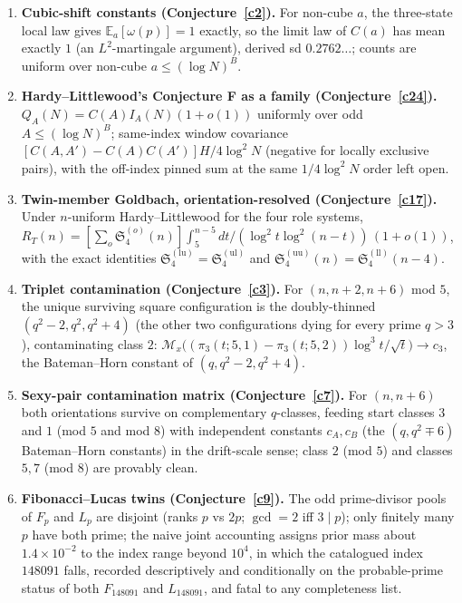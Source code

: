 \documentclass[11pt]{article}
\theoremstyle{definition}
\newcommand{\SG}{\mathfrak S}
\newcommand{\M}{\mathcal M}
\begin{document}
\begin{enumerate}
\item \textbf{Cubic-shift constants (Conjecture~\ref{c2}).}  For
non-cube $a$, the three-state local law gives
$\mathbb E_a[\omega(p)]=1$ exactly, so the limit law of $C(a)$ has
mean exactly $1$ (an $L^2$-martingale argument), derived sd
$0.2762\ldots$; counts are uniform over non-cube
$a\le(\log N)^B$.

\item \textbf{Hardy--Littlewood's Conjecture F as a family (Conjecture~\ref{c24}).}
$Q_A(N)=C(A)I_A(N)(1+o(1))$ uniformly over odd $A\le(\log N)^B$;
same-index window covariance
$[C(A,A')-C(A)C(A')]H/4\log^2N$ (negative for locally exclusive
pairs), with the off-index pinned sum at the same $1/4\log^2N$
order left open.

\item \textbf{Twin-member Goldbach, orientation-resolved
(Conjecture~\ref{c17}).}  Under $n$-uniform Hardy--Littlewood for
the four role systems,
$R_T(n)=[\sum_o\SG_4^{(o)}(n)]\int_5^{n-5}dt/(\log^2t\log^2(n-t))
\,(1+o(1))$, with the exact identities
$\SG_4^{(\mathrm{lu})}=\SG_4^{(\mathrm{ul})}$ and
$\SG_4^{(\mathrm{uu})}(n)=\SG_4^{(\mathrm{ll})}(n-4)$.

\item \textbf{Triplet contamination (Conjecture~\ref{c3}).}  For
$(n,n+2,n+6)$ mod $5$, the unique surviving square configuration is
the doubly-thinned $(q^2-2,q^2,q^2+4)$ (the other two configurations dying for every prime $q>3$), contaminating class
$2$: $\M_x\bigl((\pi_3(t;5,1)-\pi_3(t;5,2))\log^3t/\sqrt
t\bigr)\to c_3$, the Bateman--Horn constant of
$(q,q^2-2,q^2+4)$.

\item \textbf{Sexy-pair contamination matrix
(Conjecture~\ref{c7}).}  For $(n,n+6)$ both orientations survive on
complementary $q$-classes, feeding start classes $3$ and $1$ (mod
$5$ and mod $8$) with independent constants $c_A,c_B$ (the
$(q,q^2\mp6)$ Bateman--Horn constants) in the drift-scale sense;
class $2$ (mod $5$) and classes $5,7$ (mod $8$) are provably clean.

\item \textbf{Fibonacci--Lucas twins (Conjecture~\ref{c9}).}  The
odd prime-divisor pools of $F_p$ and $L_p$ are disjoint (ranks $p$
vs $2p$; $\gcd=2$ iff $3\mid p$); only finitely many $p$ have both
prime; the naive joint accounting assigns prior mass about $1.4\times10^{-2}$ to the index range beyond $10^4$, in which the catalogued index $148091$ falls, recorded
descriptively and conditionally on the probable-prime status of both
$F_{148091}$ and $L_{148091}$, and fatal to any completeness list.


\end{enumerate}
\end{document}
